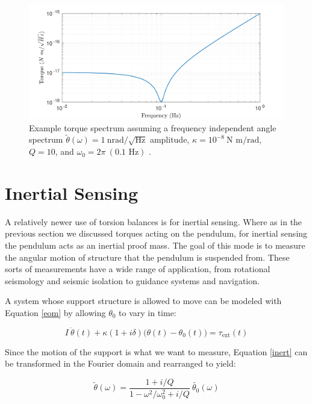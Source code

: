\documentclass{book}
\begin{document}
\begin{figure}[!h]
\begin{centering}
\includegraphics[width=\textwidth]{TorqueSpectrum.pdf}
\caption{Example torque spectrum assuming a frequency independent angle spectrum $\tilde{\theta}(\omega) = 1\ \text{nrad}/\sqrt{\text{Hz}}$ amplitude, $\kappa=10^{-8}\ \text{N m/rad}$, $Q=10$, and $\omega_0=2\pi\ (0.1 \text{ Hz})$ .}\label{torqSpec}
\end{centering}
\end{figure}
\pagebreak
\section{Inertial Sensing}

\quad A relatively newer use of torsion balances is for inertial sensing. Where as in the previous section we discussed torques acting on the pendulum, for inertial sensing the pendulum acts as an inertial proof mass. The goal of this mode is to measure the angular motion of structure that the pendulum is suspended from. These sorts of measurements have a wide range of application, from rotational seismology and seismic isolation to guidance systems and navigation. 

A system whose support structure is allowed to move can be modeled with Equation \ref{eom} by allowing $\theta_0$ to vary in time:

\begin{equation}
I~\ddot{\theta}(t)+\kappa(1+i\delta)  \big(\theta(t)-\theta_0(t)\big) = \tau_{\text{ext}}(t) \label{inert}
\end{equation}

Since the motion of the support is what we want to measure, Equation \ref{inert} can be transformed in the Fourier domain and rearranged to yield:

\begin{equation}
\tilde{\theta}(\omega)=\frac{1+i/Q}{1-\omega^2/\omega_0^2+i/Q}\ \tilde{\theta_0}(\omega) \label{inert2}
\end{equation}
\end{document}
